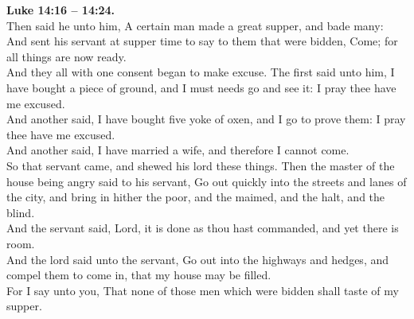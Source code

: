 \documentclass[10pt]{article} %
\begin{document}
{\begin{minipage}[t]{0.45\textwidth}
\textbf{Luke 14:16 -- 14:24.}\\
Then said he unto him, A certain man made a great supper, and bade many:\\
And sent his servant at supper time to say to them that were bidden, Come; for all things are now ready.\\
And they all with one consent began to make excuse. The first said unto him, I have bought a piece of ground, and I must needs go and see it: I pray thee have me excused.\\
And another said, I have bought five yoke of oxen, and I go to prove them: I pray thee have me excused.\\
And another said, I have married a wife, and therefore I cannot come.\\
So that servant came, and shewed his lord these things. Then the master of the house being angry said to his servant, Go out quickly into the streets and lanes of the city, and bring in hither the poor, and the maimed, and the halt, and the blind.\\
And the servant said, Lord, it is done as thou hast commanded, and yet there is room.\\
And the lord said unto the servant, Go out into the highways and hedges, and compel them to come in, that my house may be filled.\\
For I say unto you, That none of those men which were bidden shall taste of my supper.\\
\end{minipage}}
\vspace*{\fill}
\newpage\Huge
\vspace*{\fill}
\singlespacing %
\vspace*{\fill}
\end{document}
